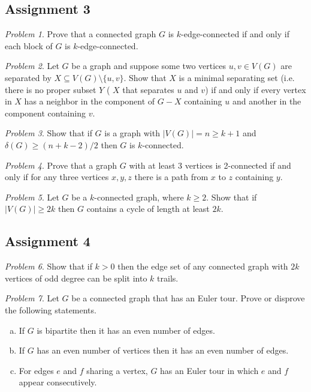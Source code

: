 \documentclass[10pt, fleqn, a4paper, landscape]{article}
\theoremstyle{plain} %
\theoremstyle{remark} %
\newtheorem{problem}{Problem}
\theoremstyle{definition} %
\begin{document}
\begin{multicols}{3}
\begin{tiny}
\subsection{Assignment 3}

\begin{problem}
Prove that a connected graph $G$ is $k$-edge-connected if and only if each block of $G$ is $k$-edge-connected.
\end{problem}

\begin{problem}
Let $G$ be a graph and suppose some two vertices $u, v \in V (G)$ are separated by $X \subseteq V (G)\setminus\{u,v\}$. Show that $X$ is a minimal separating set (i.e. there is no proper subset $Y$ ( $X$ that separates $u$ and $v$) if and only if every vertex in $X$ has a neighbor in the component
of $G-X$ containing $u$ and another in the component containing $v$.
\end{problem}

\begin{problem}
Show that if $G$ is a graph with $|V (G)| = n \ge k + 1$ and $\delta(G) \ge(n + k-2)/2$ then $G$ is $k$-connected.
\end{problem}

\begin{problem}
Prove that a graph $G$ with at least 3 vertices is 2-connected if and only if for any three vertices $x, y, z$ there is a path from $x$ to $z$ containing $y$.
\end{problem}

\begin{problem}
Let $G$ be a $k$-connected graph, where $k \ge 2$. Show that if $|V (G)| \ge 2k$ then $G$ contains a cycle of length at least $2k$.
\end{problem}

\subsection{Assignment 4}

\begin{problem}
Show that if $k > 0$ then the edge set of any connected graph with $2k$ vertices of odd degree can be split into $k$ trails.
\end{problem}

\begin{problem}
Let $G$ be a connected graph that has an Euler tour. Prove or disprove the
following statements.
\begin{enumerate}[(a)]
\item If $G$ is bipartite then it has an even number of edges.
\item If $G$ has an even number of vertices then it has an even number of edges.
\item For edges $e$ and $f$ sharing a vertex, $G$ has an Euler tour in which $e$ and $f$ appear consecutively.
\end{enumerate}
\end{problem}


\end{tiny}
\end{multicols}
\end{document}
